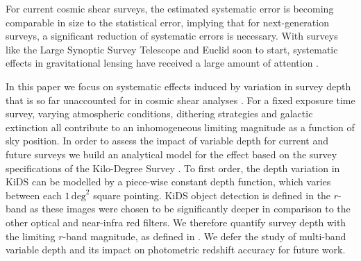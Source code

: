 \documentclass{aa}
\begin{document}

For current cosmic shear surveys, the estimated systematic error is becoming comparable in size to the statistical error, implying that for next-generation surveys, a significant reduction of systematic errors is necessary. With surveys like the Large Synoptic Survey Telescope \citep[LSST,][]{Ivezic:2008} and Euclid \citep{Laureijs:2011} soon to start, systematic effects in gravitational lensing have received a large amount of attention \citep[see][and references therein]{Mandelbaum:2019}.

In this paper we focus on systematic effects induced by variation in survey depth that is so far unaccounted for in cosmic shear analyses \citep{Vale:2004}.   For a fixed exposure time survey, varying atmospheric conditions, dithering strategies and galactic extinction all contribute to an inhomogeneous limiting magnitude as a function of sky position.   In order to assess the impact of variable depth for current and future surveys we build an analytical model for the effect based on the survey specifications of the Kilo-Degree Survey \citep[KiDS,][]{Kuijken:2015}.  To first order, the depth variation in KiDS can be modelled by a piece-wise constant depth function, which varies between each $1\,\text{deg}^2$ square pointing.   KiDS object detection is defined in the $r$-band as these images were chosen to be significantly deeper in comparison to the other optical and near-infra red filters.   We therefore quantify survey depth with the limiting $r$-band magnitude, as defined in \citet{2017A&A...604A.134D}.  We defer the study of multi-band variable depth and its impact on photometric redshift accuracy for future work.
\end{document}
